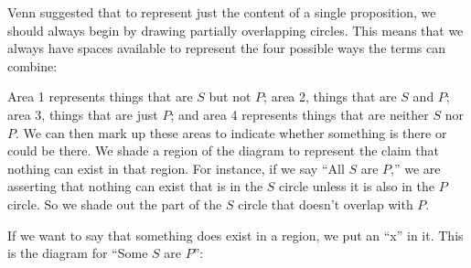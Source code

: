Venn suggested that to represent just the content of a single proposition, we should always begin by drawing partially overlapping circles. This means that we always have spaces available to represent the four possible ways the terms can combine: 

\begin{center}
\label{fig:two_circle_venn}
\end{center}

Area 1 represents things that are $S$ but not $P$; area 2, things that are $S$ and $P$; area 3, things that are just $P$; and area 4 represents things that are neither $S$ nor $P$. We can then mark up these areas to indicate whether something is there or could be there. We shade a region of the diagram to represent the claim that nothing can exist in that region. For instance, if we say ``All $S$ are $P$,'' we are asserting that nothing can exist that is in the $S$ circle unless it is also in the $P$ circle. So we shade out the part of the $S$ circle that doesn't overlap with $P$. 

\begin{center}
\end{center}


If we want to say that something does exist in a region, we put an ``x'' in it. This is the diagram for ``Some $S$ are $P$'': 

\begin{center}
\end{center}

